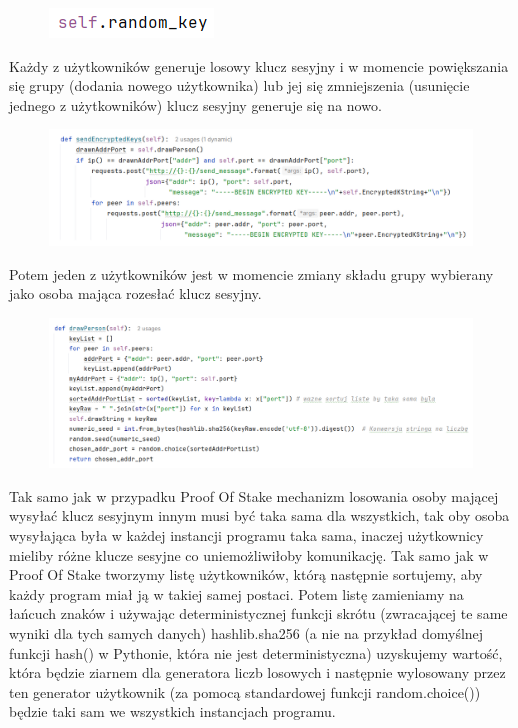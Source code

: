 \begin{figure}[H]
    \centering
    \includegraphics[width=\textwidth]{Images/CodeX135.png}
\end{figure}

Każdy z użytkowników generuje losowy klucz sesyjny i w momencie powiększania się grupy (dodania nowego użytkownika) lub jej się zmniejszenia (usunięcie jednego z użytkowników) klucz sesyjny generuje się na nowo.

\begin{figure}[H]
    \centering
    \includegraphics[width=\textwidth]{Images/CodeX14.png}
\end{figure}

Potem jeden z użytkowników jest w momencie zmiany składu grupy wybierany jako osoba mająca rozesłać klucz sesyjny.

\begin{figure}[H]
    \centering
    \includegraphics[width=\textwidth]{Images/CodeX15.png}
\end{figure}

Tak samo jak w przypadku Proof Of Stake mechanizm losowania osoby mającej wysyłać klucz sesyjnym innym musi być taka sama dla wszystkich, tak oby osoba wysyłająca była w każdej instancji programu taka sama, inaczej użytkownicy mieliby różne klucze sesyjne co uniemożliwiłoby komunikację. Tak samo jak w Proof Of Stake tworzymy listę użytkowników, którą następnie sortujemy, aby każdy program miał ją w takiej samej postaci. Potem listę zamieniamy na łańcuch znaków i używając deterministycznej funkcji skrótu (zwracającej te same wyniki dla tych samych danych) hashlib.sha256 (a nie na przykład domyślnej funkcji hash() w Pythonie, która nie jest deterministyczna) uzyskujemy wartość, która będzie ziarnem dla generatora liczb losowych i następnie wylosowany przez ten generator użytkownik (za pomocą standardowej funkcji random.choice()) będzie taki sam we wszystkich instancjach programu.


